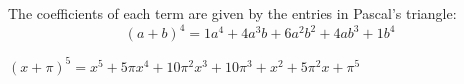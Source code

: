 The coefficients of each term are given by the entries in Pascal's triangle:
\begin{equation*}
(a + b)^4 = 1a^4 + 4a^3b + 6a^2 b^2 + 4 a b^3 + 1 b^4   
\end{equation*}

\begin{Exercise}[title={Using Pascal's Triangle}, label=pascalbinomial]
\end{Exercise}
\begin{Answer}[ref=pascalbinomial]
  $(x + \pi)^5 = x^5 + 5\pi x^4 + 10\pi^2 x^3 + 10 \pi^3 + x^2 + 5 \pi^2 x + \pi^5$
\end{Answer}


